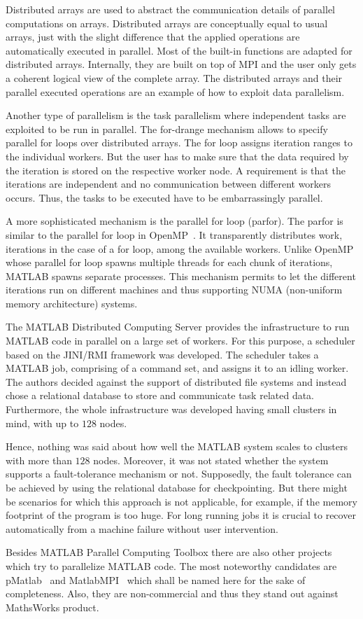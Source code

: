 Distributed arrays are used to abstract the communication details of parallel computations on arrays.
Distributed arrays are conceptually equal to usual arrays, just with the slight difference that the applied operations are automatically executed in parallel.
Most of the built-in functions are adapted for distributed arrays.
Internally, they are built on top of MPI and the user only gets a coherent logical view of the complete array.
The distributed arrays and their parallel executed operations are an example of how to exploit data parallelism.

Another type of parallelism is the task parallelism where independent tasks are exploited to be run in parallel.
The for-drange mechanism allows to specify parallel for loops over distributed arrays.
The for loop assigns iteration ranges to the individual workers.
But the user has to make sure that the data required by the iteration is stored on the respective worker node.
A requirement is that the iterations are independent and no communication between different workers occurs.
Thus, the tasks to be executed have to be embarrassingly parallel.

A more sophisticated mechanism is the parallel for loop (parfor).
The parfor is similar to the parallel for loop in OpenMP~\cite{dagum:csei1998a}.
It transparently distributes work, iterations in the case of a for loop, among the available workers.
Unlike OpenMP whose parallel for loop spawns multiple threads for each chunk of iterations, MATLAB spawns separate processes.
This mechanism permits to let the different iterations run on different machines and thus supporting NUMA (non-uniform memory architecture) systems.

The MATLAB Distributed Computing Server provides the infrastructure to run MATLAB code in parallel on a large set of workers.
For this purpose, a scheduler based on the JINI/RMI framework was developed.
The scheduler takes a MATLAB job, comprising of a command set, and assigns it to an idling worker.
The authors decided against the support of distributed file systems and instead chose a relational database to store and communicate task related data.
Furthermore, the whole infrastructure was developed having small clusters in mind, with up to $128$ nodes.

Hence, nothing was said about how well the MATLAB system scales to clusters with more than $128$ nodes.
Moreover, it was not stated whether the system supports a fault-tolerance mechanism or not.
Supposedly, the fault tolerance can be achieved by using the relational database for checkpointing.
But there might be scenarios for which this approach is not applicable, for example, if the memory footprint of the program is too huge.
For long running jobs it is crucial to recover automatically from a machine failure without user intervention.

Besides MATLAB Parallel Computing Toolbox there are also other projects which try to parallelize MATLAB code.
The most noteworthy candidates are pMatlab~\cite{bliss:ijhpca2007a} and MatlabMPI~\cite{kepner:jpdc2004a} which shall be named here for the sake of completeness.
Also, they are non-commercial and thus they stand out against MathsWorks product.
